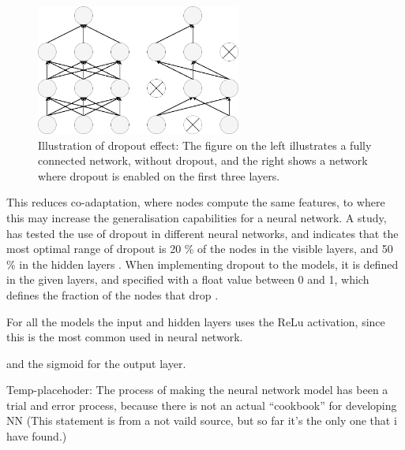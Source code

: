 \begin{figure} [H]
\centering
\includegraphics[width=0.6\textwidth]{figures/Dropout}
\caption{Illustration of dropout effect: The figure on the left illustrates a fully connected network, without dropout, and the right shows a network where dropout is enabled on the first three layers.}
\label{fig:Dropout}  
\end{figure}

This reduces co-adaptation, where nodes compute the same features, to where this may increase the generalisation capabilities for a neural network.\citep{Srivastava2014}  
A study, has tested the use of dropout in different neural networks, and indicates that the most optimal range of dropout is 20 \% of the nodes in the visible layers, and 50 \% in the hidden layers \citep{Srivastava2014}.
When implementing dropout to the models, it is defined in the given layers, and specified with a float value between 0 and 1, which defines the fraction of the nodes that drop \citep{Chollet2015}.








For all the models the input and hidden layers uses the ReLu activation, since this is the most common used in neural network. \citep{Goodfellow2016} %

and the sigmoid for the output layer.  




Temp-placehoder:
The process of making the neural network model has been a trial and error process, because there is not an actual “cookbook” for developing NN (This statement is from a not vaild source, but so far it’s the only one that i have found.) \citep{Goodfellow2016} 
